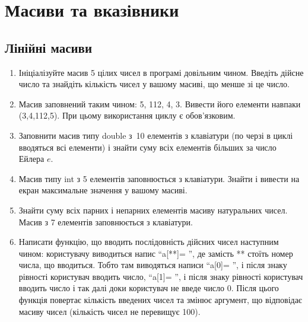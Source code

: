 \documentclass[]{article}
\begin{document}
\section{Масиви та вказівники}

\subsection{Лінійні масиви}

\begin{enumerate}
\item
Ініціалізуйте масив 5 цілих чисел в програмі довільним чином. Введіть
дійсне число та знайдіть кількість чисел у вашому масиві, що менше зі це
число.
\item
Масив заповнений таким чином: 5, 112, 4, 3. Вивести його елементи
навпаки (3,4,112,5). При цьому використання циклу є обов'язковим.
\item
Заповнити масив типу double з~10 елементів з клавіатури (по черзі в
циклі вводяться всі елементи) і знайти суму всіх елементів більших за
число Ейлера \(e\).
\item
Масив типу int з 5 елементів заповнюється з клавіатури. Знайти і вивести
на екран максимальне значення у вашому масиві.
\item
Знайти суму всіх парних і непарних елементів масиву натуральних чисел.
Масив з 7 елементів заповнюється з клавіатури.
\item
Написати функцію, що вводить послідовність дійсних чисел наступним
чином: користувачу виводиться напис ``a{[}**{]}= '', де замість **
стоїть номер числа, що вводиться. Тобто там виводяться написи
``a{[}0{]}= '', і після знаку рівності користувач вводить число,
``a{[}1{]}= '', і після знаку рівності користувач вводить число і так
далі доки користувач не введе число 0. Після цього функція повертає
кількість введених чисел та змінює аргумент, що відповідає масиву чисел
(кількість чисел не перевищує 100).


\end{enumerate}
\end{document}
